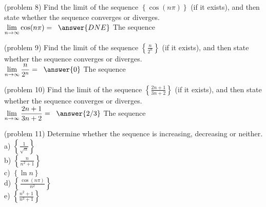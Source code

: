 \documentclass[handout]{ximera}
\begin{document}
\begin{problem}(problem 8)
Find the limit of the sequence $\displaystyle \left\{\cos(n\pi)\right\}$ (if it exists), and then state whether the sequence converges or diverges.\\
$\displaystyle \lim_{n\to \infty} \cos(n\pi) = \;\;\answer{DNE}$ \quad
The sequence 
\end{problem}


\begin{problem}(problem 9)
Find the limit of the sequence $\displaystyle \left\{\frac{n}{2^n}\right\}$ (if it exists), and then state whether the sequence converges or diverges.\\
$\displaystyle \lim_{n\to \infty} \frac{n}{2^n} = \;\;\answer{0}$ \quad
The sequence 
\end{problem}


\begin{problem}(problem 10)
Find the limit of the sequence $\displaystyle \left\{\frac{2n+1}{3n+2}\right\}$ (if it exists), and then state whether the sequence converges or diverges.\\
$\displaystyle \lim_{n\to \infty} \frac{2n+1}{3n+2} = \;\;\answer{2/3}$ \quad
The sequence 
\end{problem}


\begin{problem}(problem 11)
 Determine whether the sequence is increasing, decreasing or neither.\\
a) \;\; $\displaystyle \left\{\frac{1}{\sqrt n}\right\}$ \quad \mbox{}  \\
b) \;\; $\displaystyle \left\{\frac{n}{n^2 +1}\right\}$ \quad \mbox{ } \\
c) \;\; $\displaystyle  \left\{\ln n\right\}$ \quad \mbox{ } \\
d) \;\; $\displaystyle  \left\{\frac{\cos(n\pi)}{n^2}\right\}$ \quad \mbox{ } \\
e) \;\; $\displaystyle \left\{\frac{n^2 + 1}{n^3 + 1}\right\}$ \quad \mbox{} 
\end{problem}
\end{document}
